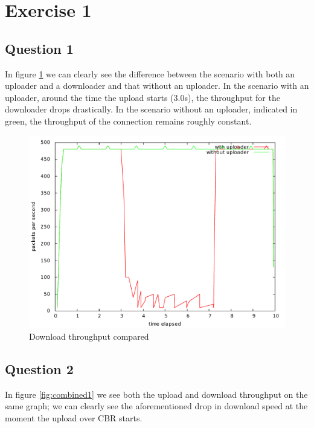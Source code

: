 \documentclass[10pt,a4paper]{article}
\begin{document}


\section{Exercise 1}
\subsection{Question 1}
In figure \ref{fig:lala} we can clearly see the difference between the
scenario with both an uploader and a downloader and that without an
uploader. In the scenario with an uploader, around the time the upload
starts (3.0s), the throughput for the downloader drops drastically. In
the scenario without an uploader, indicated in green, the throughput
of the connection remains roughly constant.

\begin{figure}[p]
    \centering
    \includegraphics[width=\textwidth]{../part1/q1/plots/1.pdf}
    \caption{Download throughput compared}
    \label{fig:lala}
\end{figure}

\subsection{Question 2}
In figure \ref{fig:combined1} we see both the upload and download
throughput on the same graph; we can clearly see the aforementioned
drop in download speed at the moment the upload over CBR starts.
\end{document}
